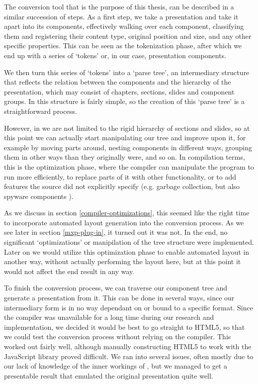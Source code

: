    The conversion tool that is the purpose of this thesis, can be described in
   a similar succession of steps. As a first step, we take a \ppt presentation
   and take it apart into its components, effectively walking over each
   component, classifying them and registering their content type, original
   position and size, and any other specific properties. This can be seen as
   the tokenization phase, after which we end up with a series of `tokens' or,
   in our case, presentation components.
  
   We then turn this series of `tokens' into a `parse tree', an intermediary
   structure that reflects the relation between the components and the
   hierarchy of the presentation, which may consist of chapters, sections,
   slides and component groups. In \ppt this structure is fairly simple, so the
   creation of this `parse tree' is a straightforward process.
  
   However, in \mxp we are not limited to the rigid hierarchy of sections and
   slides, so at this point we can actually start manipulating our tree and
   improve upon it, for example by moving parts around, nesting components in
   different ways, grouping them in other ways than they originally were, and so on.
   In compilation terms, this is the optimization phase, where the compiler can
   manipulate the program to run more efficiently, to replace parts of it with
   other functionality, or to add features the source did not explicitly specify
   (e.g. garbage collection, but also spyware components \citep{scahill-1}). 

   As we discuss in section \ref{compiler-optimizations}, this seemed like the
   right time to incorporate automated layout generation into the conversion
   process. As we see later in section \ref{mxp-plug-in}, it turned out it
   was not. In the end, no significant `optimizations' or manipilation of the
   tree structure were implemented. Later on we would utilize this optimization
   phase to enable automated layout in another way, without actually performing
   the layout here, but at this point it would not affect the end result in any
   way.
  
   To finish the conversion process, we can traverse our component tree and
   generate a \mxp presentation from it. This can be done in several ways,
   since our intermediary form is in no way dependant on or bound to a specific
   format. Since the \mxp compiler was unavailable for a long time during our
   research and implementation, we decided it would be best to go straight to
   HTML5, so that we could test the conversion process without relying on the
   \mxp compiler. This worked out fairly well, although manually constructing
   HTML5 to work with the \mxp JavaScript library proved difficult. We ran into
   several issues, often mostly due to our lack of knowledge of the inner
   workings of \mxp, but we managed to get a presentable result that emulated
   the original \ppt presentation quite well.

